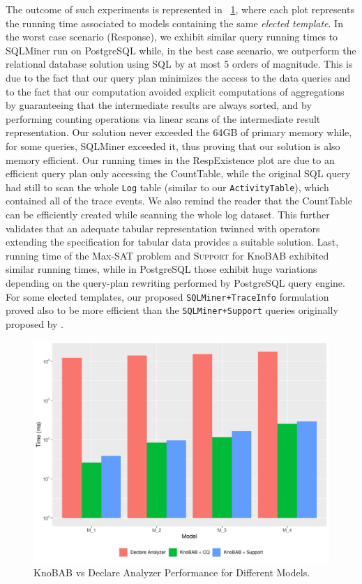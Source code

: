 The outcome of such experiments is represented in \figurename~\ref{fig:vsSQL}, where each plot represents the running time associated to models containing the same \textit{elected template}. In the worst case scenario (\textsf{Response}), we exhibit similar query running times to SQLMiner run on PostgreSQL while, in the best case scenario, we outperform the relational database solution using SQL by at most 5 orders of magnitude. This is due to the fact that our query plan minimizes the access to the data queries and to the fact that our computation avoided explicit computations of aggregations by guaranteeing that the intermediate results are always sorted, and by performing counting operations via linear scans of the intermediate result representation. Our solution never exceeded the 64GB of primary memory while, for some queries, SQLMiner exceeded it, thus proving that our solution is also memory efficient. Our running times in the \textsf{RespExistence} plot are due to an efficient query plan only accessing the  \textsf{CountTable}, while the original SQL query had still to scan the whole \texttt{Log} table (similar to our \texttt{ActivityTable}), which contained all of the trace events. We also remind the reader that the \textsf{CountTable} can be efficiently created while scanning the whole log dataset. This further validates that an adequate tabular representation twinned with \xLTLf operators extending the \LTLf specification for tabular data provides a suitable solution. Last, running time of the Max-SAT problem and \textsc{Support} for KnoBAB exhibited similar running times, while in PostgreSQL those exhibit huge variations depending on the query-plan rewriting performed by PostgreSQL query engine. For some elected templates, our proposed \texttt{SQLMiner+TraceInfo} formulation proved also to be more efficient than the \texttt{SQLMiner+Support} queries originally proposed by \cite{Schonig15}.

\begin{figure}[!t]
	\centering
	\includegraphics[width=.8\textwidth]{images/burattin_benchmark.pdf}
	\caption{KnoBAB vs Declare Analyzer Performance for Different Models.}\label{fig:vsSQL}
\end{figure}

